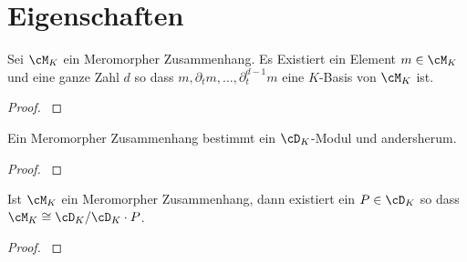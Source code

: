 \section{Eigenschaften}
\begin{comment}
\cite[4.2]{sabbah_cimpa90}
Let $\cM$ be a left $\cD$-module. First we consider it only as a
$\C\{x\}$-module and let $\cM[x^{-1}]$ be the localized module.
\end{comment}

\begin{lem} \label{lem:Zyklischer-Vektor}
\cite[Thm 4.3.3]{sabbah_cimpa90}
\cite[Satz 4.8]{ZulaBarbara}
Sei $\cM_K$ ein Meromorpher Zusammenhang. Es Existiert ein Element
$m\in\cM_K$ und eine ganze Zahl $d$ so dass
$m,\partial_tm,\dots,\partial_t^{d-1}m$ eine $K$-Basis von $\cM_K$ ist.
\end{lem}
\begin{proof}
\cite[Satz 4.8]{ZulaBarbara}
\end{proof}

\begin{thm}
\cite[Thm 4.3.2]{sabbah_cimpa90}
Ein Meromorpher Zusammenhang bestimmt ein $\cD_K$-Modul
und andersherum.
\end{thm}
\begin{proof}
\cite[Thm 4.3.2]{sabbah_cimpa90}
\end{proof}

\begin{lem}
\cite[Satz 4.12]{ZulaBarbara}
\cite[Thm 4.3.2]{sabbah_cimpa90}
Ist $\cM_K$ ein Meromorpher Zusammenhang, dann existiert ein $P\in\cD_K$ so
dass $\cM_K\cong\cD_K/\cD_K\cdot P$.
\end{lem}
\begin{proof}
\cite[Satz 4.12]{ZulaBarbara}
\end{proof}
\begin{comment}
\begin{rem}
\cite[Proof of Theorem 5.4.7]{sabbah_cimpa90}
\[
\dim_{\hat K}\cM_{\hat K} =\deg P \mbox{ wenn } \cM_{\hat K}=\cD/\cD\cdot P
\]
\end{rem}
\end{comment}

